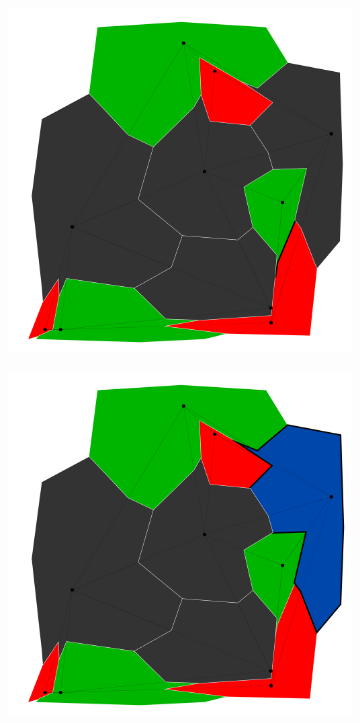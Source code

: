 \documentclass{article}
\begin{document}
\begin{figure}[h!]
			\begin{subfigure}{0.18\textwidth}
				\centering
				\includegraphics[width=\textwidth]{images/sequences/simple_backtracking/bt_simple_I00009}
				\caption{}
				\label{bt1}
			\end{subfigure}
			\;
			\begin{subfigure}{0.18\textwidth}
				\centering
				\includegraphics[width=\textwidth]{images/sequences/simple_backtracking/bt_simple_I00012}

\end{subfigure}
\end{figure}
\end{document}
